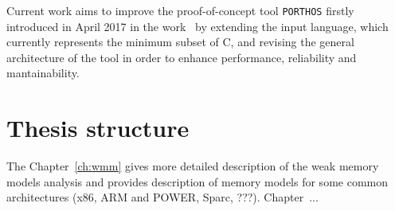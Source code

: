 Current work aims to improve the proof-of-concept tool \texttt{PORTHOS} firstly introduced in April 2017 in the work~\cite{Porthos17} by extending the input language, which currently represents the minimum subset of C, and revising the general architecture of the tool in order to enhance performance, reliability and mantainability.

\section{Thesis structure}
\label{ch:intro:structure}

The Chapter~\ref{ch:wmm} gives more detailed description of the weak memory models analysis and provides description of memory models for some common architectures (x86, ARM and POWER, Sparc, ???). Chapter~...

